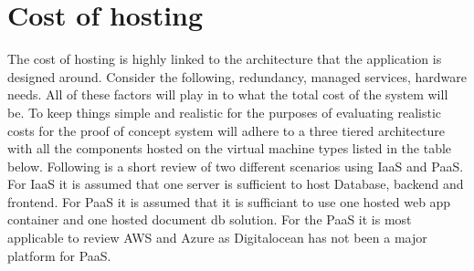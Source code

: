 \documentclass[]{uiophd}
\begin{document}
\section{Cost of hosting}
The cost of hosting is highly linked to the architecture that the application is designed around. Consider the following, redundancy, managed services, hardware needs. All of these factors will play in to what the total cost of the system will be. To keep things simple and realistic for the purposes of evaluating realistic costs for the proof of concept system will adhere to a three tiered architecture with all the components hosted on the virtual machine types listed in the table below. Following is a short review of two different scenarios using IaaS and PaaS. For IaaS it is assumed that one server is sufficient to host Database, backend and frontend. For PaaS it is assumed that it is sufficiant to use one hosted web app container and one hosted document db solution. For the PaaS it is most applicable to review AWS and Azure as Digitalocean has not been a major platform for PaaS.
\end{document}
